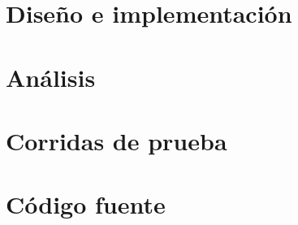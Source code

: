 \documentclass[11pt,a4paper]{article}
\begin{document}
		

	\setcounter{page}{1}
	\section{Diseño e implementación}	\label{sec:design}
		

	\section{Análisis} 			\label{sec:analisis}
		

	\section{Corridas de prueba}
		
	
	\section{Código fuente}
		
\end{document}
